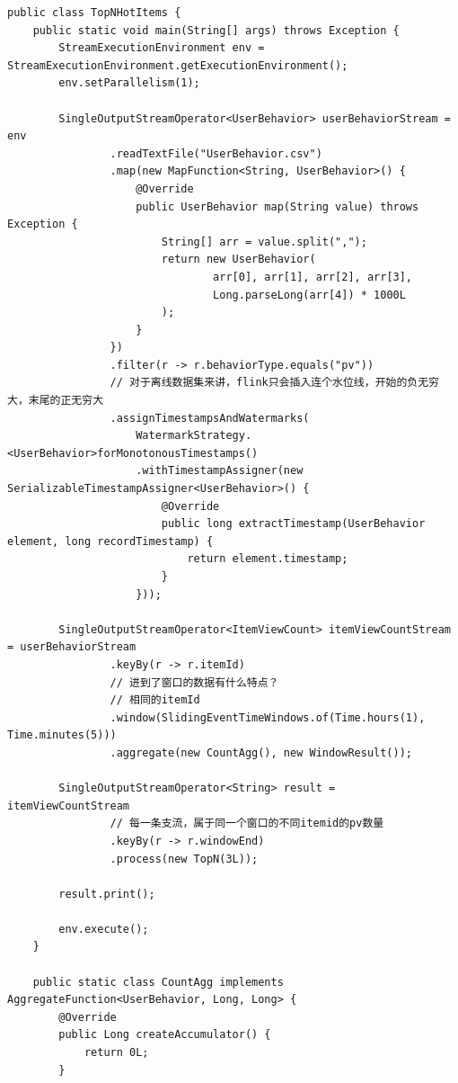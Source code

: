 \documentclass[cn,11pt,chinese]{elegantbook}
\begin{document}
\begin{verbatim}
public class TopNHotItems {
    public static void main(String[] args) throws Exception {
        StreamExecutionEnvironment env = StreamExecutionEnvironment.getExecutionEnvironment();
        env.setParallelism(1);

        SingleOutputStreamOperator<UserBehavior> userBehaviorStream = env
                .readTextFile("UserBehavior.csv")
                .map(new MapFunction<String, UserBehavior>() {
                    @Override
                    public UserBehavior map(String value) throws Exception {
                        String[] arr = value.split(",");
                        return new UserBehavior(
                                arr[0], arr[1], arr[2], arr[3],
                                Long.parseLong(arr[4]) * 1000L
                        );
                    }
                })
                .filter(r -> r.behaviorType.equals("pv"))
                // 对于离线数据集来讲，flink只会插入连个水位线，开始的负无穷大，末尾的正无穷大
                .assignTimestampsAndWatermarks(
                    WatermarkStrategy.<UserBehavior>forMonotonousTimestamps()
                    .withTimestampAssigner(new SerializableTimestampAssigner<UserBehavior>() {
                        @Override
                        public long extractTimestamp(UserBehavior element, long recordTimestamp) {
                            return element.timestamp;
                        }
                    }));

        SingleOutputStreamOperator<ItemViewCount> itemViewCountStream = userBehaviorStream
                .keyBy(r -> r.itemId)
                // 进到了窗口的数据有什么特点？
                // 相同的itemId
                .window(SlidingEventTimeWindows.of(Time.hours(1), Time.minutes(5)))
                .aggregate(new CountAgg(), new WindowResult());

        SingleOutputStreamOperator<String> result = itemViewCountStream
                // 每一条支流，属于同一个窗口的不同itemid的pv数量
                .keyBy(r -> r.windowEnd)
                .process(new TopN(3L));

        result.print();

        env.execute();
    }

    public static class CountAgg implements AggregateFunction<UserBehavior, Long, Long> {
        @Override
        public Long createAccumulator() {
            return 0L;
        }


\end{verbatim}
\end{document}
